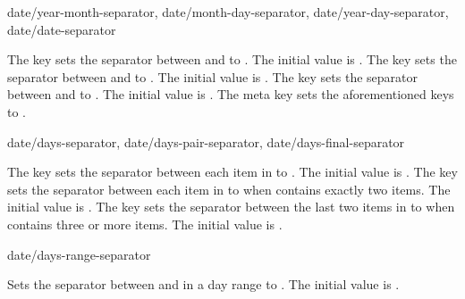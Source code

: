 \documentclass{beery}
\begin{document}
\begin{variable}
    {
      date/year-month-separator,
      date/month-day-separator,
      date/year-day-separator,
      date/date-separator
    }
  \begin{syntax}
  \end{syntax}
  The key  sets the separator between  and  to .
  The initial value is \key{=\textvisiblespace}.
  The key  sets the separator between  and  to .
  The initial value is \key{=\textvisiblespace}.
  The key  sets the separator between  and  to .
  The initial value is \key{=,\textvisiblespace}.
  The meta key  sets the aforementioned keys to .
\end{variable}

\begin{variable}
  {
    date/days-separator,
    date/days-pair-separator,
    date/days-final-separator
  }
  \begin{syntax}
  \end{syntax}
  The key  sets the separator between each item in  to .
  The initial value is \key{=,\textvisiblespace}.
  The key  sets the separator between each item in  to  when  contains exactly two items.
  The initial value is .
  The key  sets the separator between the last two items in  to  when  contains three or more items.
  The initial value is .
\end{variable}

\begin{variable}{date/days-range-separator}
  \begin{syntax}
  \end{syntax}
  Sets the separator between  and  in a day range to .
  The initial value is .
\end{variable}
\end{document}
